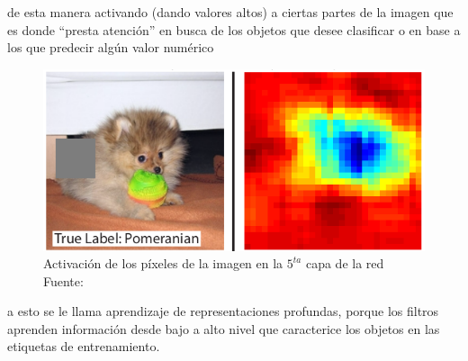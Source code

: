     \noindent de esta manera activando (dando valores altos) a ciertas partes de la imagen que es donde ``presta atención'' en busca de los objetos que desee clasificar o en base a los que predecir algún valor numérico

    \begin{figure}[H]
            \centering
            \includegraphics[scale=0.5]{imagenes/activation_cnn}
            \caption{Activación de los píxeles de la imagen en la $5^{ta}$ capa de la red\\ Fuente: \citep{10.1007/978-3-319-10590-1_53}}
        \end{figure}
    \noindent a esto se le llama aprendizaje de representaciones profundas, porque los filtros aprenden información desde bajo a alto nivel que caracterice los objetos en las etiquetas de entrenamiento. 
